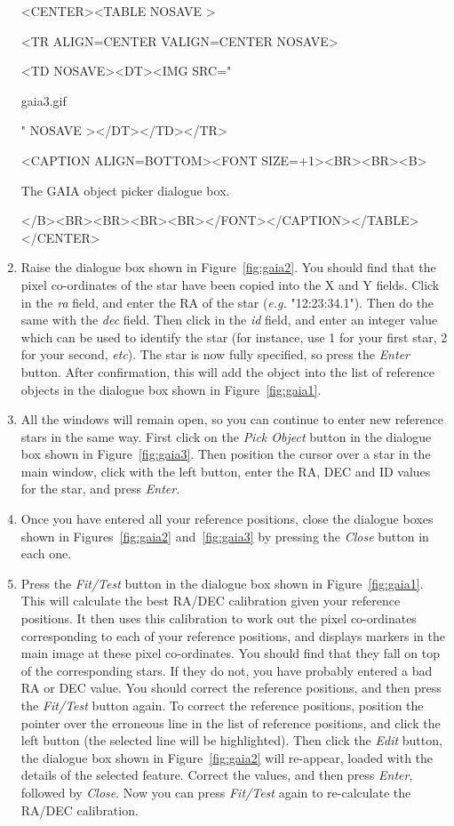 \documentclass[twoside,11pt]{article}
\renewcommand{\_}{\texttt{\symbol{95}}}
\newcommand{\htmlfig}[3]{
   \label{#1}
   \begin{rawhtml} <CENTER><TABLE NOSAVE > \end{rawhtml}
   \begin{rawhtml} <TR ALIGN=CENTER VALIGN=CENTER NOSAVE> \end{rawhtml}
   \begin{rawhtml} <TD NOSAVE><DT><IMG SRC=" \end{rawhtml}
   #2
   \begin{rawhtml} " NOSAVE ></DT></TD></TR> \end{rawhtml}
   \begin{rawhtml} <CAPTION ALIGN=BOTTOM><FONT SIZE=+1><BR><BR><B> \end{rawhtml}
   #3 
   \begin{rawhtml} </B><BR><BR><BR><BR></FONT></CAPTION></TABLE></CENTER> \end{rawhtml}
}
\begin{document}
\begin{enumerate}
\begin{htmlonly}
\htmlfig{fig:gaia3}{gaia3.gif}{
The GAIA object picker dialogue box.}
\end{htmlonly}

\item Raise the dialogue box shown in Figure~\ref{fig:gaia2}. You should
find that the pixel co-ordinates of the star have been copied into the
X and Y fields. Click in the \emph{ra} field, and enter the RA of the 
star (\emph{e.g.} "12:23:34.1"). Then do the same with the \emph{dec} field. Then
click in the \emph{id} field, and enter an integer value which can be
used to identify the star (for instance, use 1 for your first star, 2 for
your second, \emph{etc}). The star is now fully specified, so press the
\emph{Enter} button. After confirmation, this will add the object into
the list of reference objects in the dialogue box shown in
Figure~\ref{fig:gaia1}. 

\item All the windows will remain open, so you can continue to enter new
reference stars in the same way. First click on the \emph{Pick Object} 
button in the dialogue box shown in Figure~\ref{fig:gaia3}. Then position
the cursor over a star in the main window, click with the left button, enter 
the RA, DEC and ID values for the star, and press \emph{Enter}.

\item Once you have entered all your reference positions, close the
dialogue boxes shown in Figures~\ref{fig:gaia2} and~\ref{fig:gaia3} by
pressing the \emph{Close} button in each one.

\item Press the \emph{Fit/Test} button in the dialogue box shown in
Figure~\ref{fig:gaia1}. This will calculate the best RA/DEC calibration
given your reference positions. It then uses this calibration to work out
the pixel co-ordinates corresponding to each of your reference positions,
and displays markers in the main image at these pixel co-ordinates. You
should find that they fall on top of the corresponding stars. If they do
not, you have probably entered a bad RA or DEC value. You should correct
the reference positions, and then press the \emph{Fit/Test} button again. To 
correct the reference positions, position the pointer over the erroneous
line in the list of reference positions, and click the left button (the 
selected line will be highlighted). Then click the \emph{Edit} button, the
dialogue box shown in Figure~\ref{fig:gaia2} will re-appear, loaded with
the details of the selected feature. Correct the values, and then press
\emph{Enter}, followed by \emph{Close}. Now you can press \emph{Fit/Test}
again to re-calculate the RA/DEC calibration.


\end{enumerate}
\end{document}
